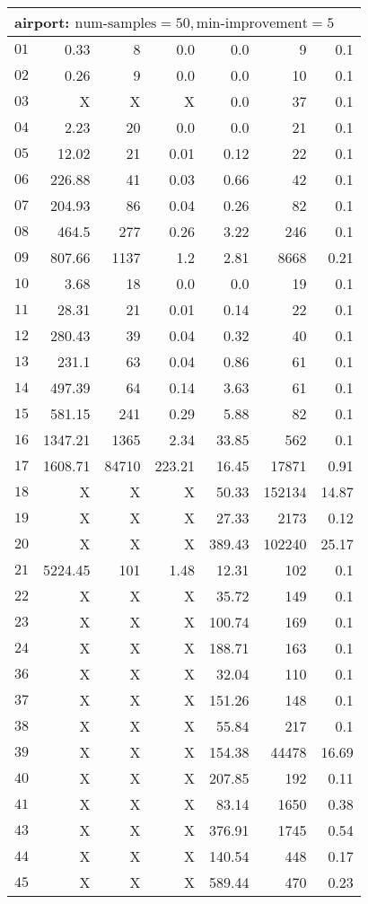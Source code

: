\begin{longtable}{|c||r|r|r||r|r|r|}
\multicolumn{7}{|l|}{airport: $\text{num-samples}=50,\text{min-improvement}=5$}\\\hline
$01$ & 0.33 & 8 & 0.0 & 0.0 & 9 & 0.1 \\\hline
$02$ & 0.26 & 9 & 0.0 & 0.0 & 10 & 0.1 \\\hline
$03$ &  X &  X &  X & 0.0 & 37 & 0.1 \\\hline
$04$ & 2.23 & 20 & 0.0 & 0.0 & 21 & 0.1 \\\hline
$05$ & 12.02 & 21 & 0.01 & 0.12 & 22 & 0.1 \\\hline
$06$ & 226.88 & 41 & 0.03 & 0.66 & 42 & 0.1 \\\hline
$07$ & 204.93 & 86 & 0.04 & 0.26 & 82 & 0.1 \\\hline
$08$ & 464.5 & 277 & 0.26 & 3.22 & 246 & 0.1 \\\hline
$09$ & 807.66 & 1137 & 1.2 & 2.81 & 8668 & 0.21 \\\hline
$10$ & 3.68 & 18 & 0.0 & 0.0 & 19 & 0.1 \\\hline
$11$ & 28.31 & 21 & 0.01 & 0.14 & 22 & 0.1 \\\hline
$12$ & 280.43 & 39 & 0.04 & 0.32 & 40 & 0.1 \\\hline
$13$ & 231.1 & 63 & 0.04 & 0.86 & 61 & 0.1 \\\hline
$14$ & 497.39 & 64 & 0.14 & 3.63 & 61 & 0.1 \\\hline
$15$ & 581.15 & 241 & 0.29 & 5.88 & 82 & 0.1 \\\hline
$16$ & 1347.21 & 1365 & 2.34 & 33.85 & 562 & 0.1 \\\hline
$17$ & 1608.71 & 84710 & 223.21 & 16.45 & 17871 & 0.91 \\\hline
$18$ &  X &  X &  X & 50.33 & 152134 & 14.87 \\\hline
$19$ &  X &  X &  X & 27.33 & 2173 & 0.12 \\\hline
$20$ &  X &  X &  X & 389.43 & 102240 & 25.17 \\\hline
$21$ & 5224.45 & 101 & 1.48 & 12.31 & 102 & 0.1 \\\hline
$22$ &  X &  X &  X & 35.72 & 149 & 0.1 \\\hline
$23$ &  X &  X &  X & 100.74 & 169 & 0.1 \\\hline
$24$ &  X &  X &  X & 188.71 & 163 & 0.1 \\\hline
$36$ &  X &  X &  X & 32.04 & 110 & 0.1 \\\hline
$37$ &  X &  X &  X & 151.26 & 148 & 0.1 \\\hline
$38$ &  X &  X &  X & 55.84 & 217 & 0.1 \\\hline
$39$ &  X &  X &  X & 154.38 & 44478 & 16.69 \\\hline
$40$ &  X &  X &  X & 207.85 & 192 & 0.11 \\\hline
$41$ &  X &  X &  X & 83.14 & 1650 & 0.38 \\\hline
$43$ &  X &  X &  X & 376.91 & 1745 & 0.54 \\\hline
$44$ &  X &  X &  X & 140.54 & 448 & 0.17 \\\hline
$45$ &  X &  X &  X & 589.44 & 470 & 0.23 \\\hline


\end{longtable}
